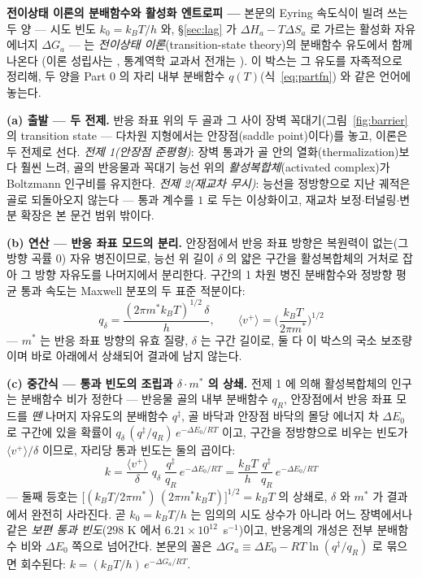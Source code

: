 \begin{bgbox}
\textbf{전이상태 이론의 분배함수와 활성화 엔트로피 ---} 본문의 Eyring 속도식이 빌려 쓰는 두 양 --- 시도
빈도 $k_0=k_BT/h$ 와, \S\ref{sec:lag} 가 $\Delta H_a-T\Delta S_a$ 로 가르는 활성화 자유에너지 $\Delta G_a$
--- 는 \emph{전이상태 이론}(transition-state theory)의 분배함수 유도에서 함께 나온다
\cite{eyring1935,glasstone1941}(이론 성립사는 \cite{laidlerking1983}, 통계역학 교과서 전개는
\cite{mcquarrie1976}). 이 박스는 그 유도를 자족적으로 정리해, 두 양을 Part 0 의 자리 내부 분배함수
$q(T)$(식~\eqref{eq:partfn}) 와 같은 언어에 놓는다.

\textbf{(a) 출발 --- 두 전제.} 반응 좌표 위의 두 골과 그 사이 장벽 꼭대기(그림~\ref{fig:barrier} 의
transition state --- 다차원 지형에서는 안장점(saddle point)이다)를 놓고, 이론은 두 전제로 선다.
\emph{전제 1(안장점 준평형)}: 장벽 통과가 골 안의 열화(thermalization)보다 훨씬 느려, 골의 반응물과
꼭대기 능선 위의 \emph{활성복합체}(activated complex)가 Boltzmann 인구비를 유지한다. \emph{전제
2(재교차 무시)}: 능선을 정방향으로 지난 궤적은 골로 되돌아오지 않는다 --- 통과 계수를 $1$ 로 두는
이상화이고, 재교차 보정$\cdot$터널링$\cdot$변분 확장은 본 문건 범위 밖이다.

\textbf{(b) 연산 --- 반응 좌표 모드의 분리.} 안장점에서 반응 좌표 방향은 복원력이 없는(그 방향 곡률 $0$)
자유 병진이므로, 능선 위 길이 $\delta$ 의 얇은 구간을 활성복합체의 거처로 잡아 그 방향 자유도를 나머지에서
분리한다. 구간의 1 차원 병진 분배함수와 정방향 평균 통과 속도는 Maxwell 분포의 두 표준 적분이다:
\begin{equation}
q_\delta=\frac{(2\pi m^{*}k_BT)^{1/2}\,\delta}{h},\qquad
\langle v^{+}\rangle=\Big(\frac{k_BT}{2\pi m^{*}}\Big)^{1/2}
\label{eq:tst-flux}
\end{equation}
--- $m^{*}$ 는 반응 좌표 방향의 유효 질량, $\delta$ 는 구간 길이로, 둘 다 이 박스의 국소 보조량이며 바로
아래에서 상쇄되어 결과에 남지 않는다.

\textbf{(c) 중간식 --- 통과 빈도의 조립과 $\delta\cdot m^{*}$ 의 상쇄.} 전제 1 에 의해 활성복합체의 인구는
분배함수 비가 정한다 --- 반응물 골의 내부 분배함수 $q_R$, 안장점에서 반응 좌표 모드를 \emph{뗀} 나머지
자유도의 분배함수 $q^\ddagger$, 골 바닥과 안장점 바닥의 몰당 에너지 차 $\Delta E_0$ 로 구간에 있을 확률이
$q_\delta\,(q^\ddagger/q_R)\,e^{-\Delta E_0/RT}$ 이고, 구간을 정방향으로 비우는 빈도가
$\langle v^{+}\rangle/\delta$ 이므로, 자리당 통과 빈도는 둘의 곱이다:
\begin{equation}
k=\frac{\langle v^{+}\rangle}{\delta}\;q_\delta\;\frac{q^\ddagger}{q_R}\,e^{-\Delta E_0/RT}
=\frac{k_BT}{h}\,\frac{q^\ddagger}{q_R}\,e^{-\Delta E_0/RT}
\label{eq:tst-rate}
\end{equation}
--- 둘째 등호는 $\big[(k_BT/2\pi m^{*})\,(2\pi m^{*}k_BT)\big]^{1/2}=k_BT$ 의 상쇄로, $\delta$ 와 $m^{*}$
가 결과에서 완전히 사라진다. 곧 $k_0=k_BT/h$ 는 임의의 시도 상수가 아니라 어느 장벽에서나 같은 \emph{보편
통과 빈도}($298$ K 에서 $6.21\times10^{12}$~s$^{-1}$)이고, 반응계의 개성은 전부 분배함수 비와 $\Delta E_0$
쪽으로 넘어간다. 본문의 꼴은 $\Delta G_a\equiv\Delta E_0-RT\ln(q^\ddagger/q_R)$ 로 묶으면 회수된다:
$k=(k_BT/h)\,e^{-\Delta G_a/RT}$.


\end{bgbox}
